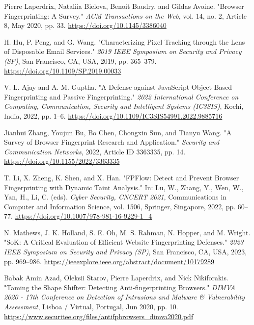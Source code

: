 \documentclass[conference]{IEEEtran}
\begin{document}
\begin{thebibliography}{00}
 Pierre Laperdrix, Nataliia Bielova, Benoit Baudry, and Gildas Avoine. "Browser Fingerprinting: A Survey." \textit{ACM Transactions on the Web}, vol. 14, no. 2, Article 8, May 2020, pp. 33. \url{https://doi.org/10.1145/3386040}

 H. Hu, P. Peng, and G. Wang. "Characterizing Pixel Tracking through the Lens of Disposable Email Services." \textit{2019 IEEE Symposium on Security and Privacy (SP)}, San Francisco, CA, USA, 2019, pp. 365–379. \url{https://doi.org/10.1109/SP.2019.00033}

 V. L. Ajay and A. M. Guptha. "A Defense against JavaScript Object-Based Fingerprinting and Passive Fingerprinting." \textit{2022 International Conference on Computing, Communication, Security and Intelligent Systems (IC3SIS)}, Kochi, India, 2022, pp. 1–6. \url{https://doi.org/10.1109/IC3SIS54991.2022.9885716}

 Jianhui Zhang, Youjun Bu, Bo Chen, Chongxin Sun, and Tianyu Wang. "A Survey of Browser Fingerprint Research and Application." \textit{Security and Communication Networks}, 2022, Article ID 3363335, pp. 14. \url{https://doi.org/10.1155/2022/3363335}

 T. Li, X. Zheng, K. Shen, and X. Han. "FPFlow: Detect and Prevent Browser Fingerprinting with Dynamic Taint Analysis." In: Lu, W., Zhang, Y., Wen, W., Yan, H., Li, C. (eds). \textit{Cyber Security, CNCERT 2021}, Communications in Computer and Information Science, vol. 1506, Springer, Singapore, 2022, pp. 60–77. \url{https://doi.org/10.1007/978-981-16-9229-1\_4}

 N. Mathews, J. K. Holland, S. E. Oh, M. S. Rahman, N. Hopper, and M. Wright. "SoK: A Critical Evaluation of Efficient Website Fingerprinting Defenses." \textit{2023 IEEE Symposium on Security and Privacy (SP)}, San Francisco, CA, USA, 2023, pp. 969–986. \url{https://ieeexplore.ieee.org/abstract/document/10179289}

 Babak Amin Azad, Oleksii Starov, Pierre Laperdrix, and Nick Nikiforakis. "Taming the Shape Shifter: Detecting Anti-fingerprinting Browsers." \textit{DIMVA 2020 - 17th Conference on Detection of Intrusions and Malware \& Vulnerability Assessment}, Lisboa / Virtual, Portugal, Jun 2020, pp. 10. \url{https://www.securitee.org/files/antifpbrowsers\_dimva2020.pdf}

\end{thebibliography}



\vspace{12pt}
\end{document}

